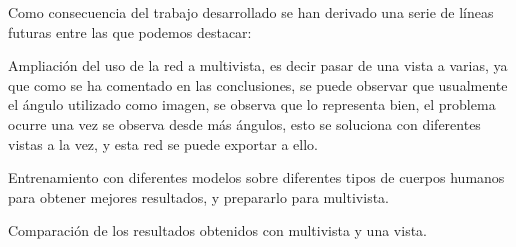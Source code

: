 Como consecuencia del trabajo desarrollado se han derivado una serie de líneas futuras entre las que podemos destacar:

Ampliación del uso de la red a multivista, es decir pasar de una vista a varias, ya que como se ha comentado en las conclusiones, se puede observar que usualmente el ángulo utilizado como imagen, se observa que lo representa bien, el problema ocurre una vez se observa desde más ángulos, esto se soluciona con diferentes vistas a la vez, y esta red se puede exportar a ello.

Entrenamiento con diferentes modelos sobre diferentes tipos de cuerpos humanos para obtener mejores resultados, y prepararlo para multivista.

Comparación de los resultados obtenidos con multivista y una vista.
